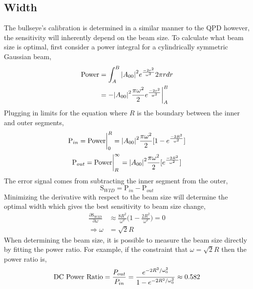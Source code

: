\begin{appendices}
	\subsection{Width}
	 The bullseye's calibration is determined in a similar manner to the QPD however, the sensitivity will inherently depend on the beam size. To calculate what beam size is optimal, first consider a power integral for a cylindrically symmetric Gaussian beam,
	\begin{equation}
	\begin{split}
	\text{Power} &= \int_{A}^{B} \abs{A_{00}}^2e^{\frac{-2r^2}{\omega^2}} 2\pi r dr\\
			&= -\abs{A_{00}}^2 \frac{\pi \omega^2}{2} e^{\frac{-2r^2}{\omega^2}} \biggr\rvert_A^B
	\end{split}
	\end{equation}
	Plugging in limits for the equation where $R$ is the boundary between the inner and outer segments,
	\begin{equation}
	\text{P}_{in} = \text{Power} \biggr\rvert_0^{R} = \abs{A_{00}}^2 \frac{\pi \omega^2}{2} [1 - e^{\frac{-2R^2}{\omega^2}}]
	\end{equation}
	\begin{equation}
	\text{P}_{out} = \text{Power} \biggr\rvert_{R}^{\infty} = \abs{A_{00}}^2 \frac{\pi \omega^2}{2} [e^{\frac{-2R^2}{\omega^2}}]
	\end{equation}
	The error signal comes from subtracting the inner segment from the outer,
	\begin{equation}
	\text{S}_{WID} =  \text{P}_{in} - \text{P}_{out}
	\end{equation}
	Minimizing the derivative with respect to the beam size will determine the optimal width which gives the best sensitivity to beam size change,
	\begin{equation}
	\begin{aligned}
	\frac{\partial \text{S}_{WID}}{\partial \omega} &\approx \frac{8 R^2}{\omega^2} \bigg(1-\frac{2 R^2}{\omega^2}\bigg) = 0 \\
	\Rightarrow	\omega &= \sqrt{2} R
	\end{aligned}
	\end{equation}
	When determining the beam size, it is possible to measure the beam size directly by fitting the power ratio. For example, if the constraint that $\omega = \sqrt{2} R$ then the power ratio is,
	\begin{equation}
	\text{DC Power Ratio} 
	= \frac{P_{out}}{P_{in}} \\
	= \frac{e^{-2R^2/ \omega_{0}^2}} {1 - e^{-2R^2/ \omega_{0}^2 }} \approx 0.582
	\end{equation}


\end{appendices}
